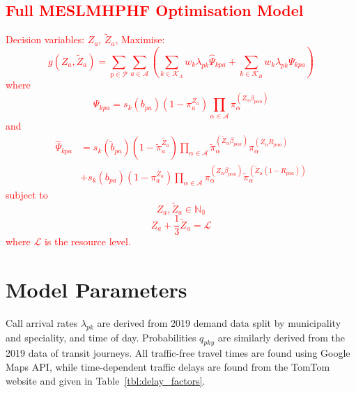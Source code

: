 \documentclass[numbers,webpdf,imaman]{ima-authoring-template}%
\begin{document}
\newpage

\textcolor{red}{
\section{Full MESLMHPHF Optimisation Model}\label{apx:fullmodel}
Decision variables: $Z_a$, $\tilde{Z}_a$,
Maximise:
\begin{equation*}
g\left(Z_a, \tilde{Z}_a\right) =
\sum_{p \in \mathcal{P}} \sum_{a \in \mathcal{A}}
\left( \sum_{k \in \mathcal{K}_A}  w_k \lambda_{pk} \hat{\Psi}_{kpa} +
\sum_{k \in \mathcal{K}_B}  w_k \lambda_{pk} \Psi_{kpa} \right)
\end{equation*}
where
\begin{equation*}
\Psi_{kpa} = s_k\left( b_{pa} \right)
\left(1 - \pi_{a}^{Z_a} \right)
\prod_{\alpha \in \mathcal{A}}
\pi_{\alpha}^{\left(Z_{\alpha} \beta_{p\alpha a} \right)}
\end{equation*}
and
\begin{align*}
\hat{\Psi}_{kpa} &= s_k\left(\tilde{b}_{pa}\right)
\left(1 - \tilde{\pi}_{a}^{\tilde{Z}_a} \right)
\prod_{\alpha \in \mathcal{A}}
\tilde{\pi}_{\alpha}^{\left(\tilde{Z}_{\alpha} \beta_{p\alpha a}\right)}
\pi_{\alpha}^{\left(Z_{\alpha} R_{p \alpha a}\right) } \nonumber \\
&+ s_k\left(b_{pa}\right) \left(1 - \pi_{a}^{Z_a} \right)
\prod_{\alpha \in \mathcal{A}}
\pi_{\alpha}^{\left(Z_{\alpha}\beta_{p\alpha a}\right)}
\tilde{\pi}_{\alpha}^{\left(\tilde{Z}_{\alpha}
\left(1 - R _{p a\alpha}\right)\right)}
\end{align*}
subject to
\begin{equation*}
Z_a, \tilde{Z}_a \in \mathbb{N_0}
\end{equation*}
\begin{equation*}
Z_a + \frac{1}{3} \tilde{Z}_a = \mathcal{L}
\end{equation*}
where $\mathcal{L}$ is the resource level.
}

\section{Model Parameters}\label{apx:parameters}
Call arrival rates $\lambda_{pk}$ are derived from 2019 demand data split by
municipality and speciality, and time of day. Probabilities $q_{pky}$ are
similarly derived from the 2019 data of transit journeys. All traffic-free
travel times are found using Google Maps API, while time-dependent traffic
delays are found from the TomTom website and given in
Table~\ref{tbl:delay_factors}.
\end{document}
